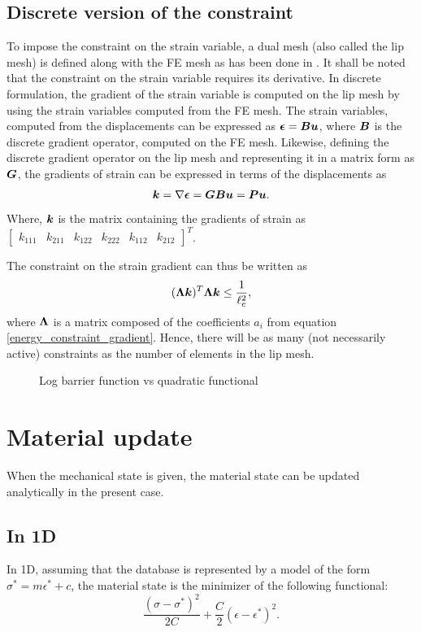\documentclass[10pt]{elsarticle}
\begin{document}
\subsection{Discrete version of the constraint}
To impose the constraint on the strain variable, a dual mesh (also called the lip mesh) is defined along with the FE mesh as has been done in \cite{Moes and Chevaugeon}. It shall be noted that the constraint on the strain variable requires its derivative. In discrete formulation, the gradient of the strain variable is computed on the lip mesh by using the strain variables computed from the FE mesh. The strain variables, computed from the displacements can be expressed as $\mbox{\boldmath $\epsilon$} = \mbox{\boldmath $B$} \mbox{\boldmath $u$}$, where $\mbox{\boldmath $B$}$ is the discrete gradient operator, computed on the FE mesh. Likewise, defining the discrete gradient operator on the lip mesh and representing it in a matrix form as $\mbox{\boldmath $G$}$, the gradients of strain can be expressed in terms of the displacements as 
\begin{equation}
	\mbox{\boldmath $k$} = \nabla \mbox{\boldmath $\epsilon$} = \mbox{\boldmath $G$} \mbox{\boldmath $B$} \mbox{\boldmath $u$} = \mbox{\boldmath $P$} \mbox{\boldmath $u$}.
\end{equation}
Where, $\mbox{\boldmath $k$}$ is the matrix containing the gradients of strain as $\begin{bmatrix}
	k_{111} & k_{211} & k_{122} & k_{222} & k_{112} & k_{212}
\end{bmatrix}^T$.

The constraint on the strain gradient can thus be written as 
\begin{equation} \label{discrete_constraint}
	(\mbox{\boldmath $\Lambda$} \mbox{\boldmath $k$} )^T \mbox{\boldmath $\Lambda$} \mbox{\boldmath $k$} \leq \frac{1}{\ell_c^2},
\end{equation}
where $\mbox{\boldmath $\Lambda$}$ is a matrix composed of the coefficients $a_i$ from equation \ref{energy_constraint_gradient}. Hence, there will be as many (not necessarily active) constraints as the number of elements in the lip mesh.

\begin{figure}[ht]
	\centering
	
	\caption{Log barrier function vs quadratic functional}
	\label{comparison_log_quadratic}
\end{figure}


\section{Material update\label{app_mat_update}}
When the mechanical state is given, the material state can be updated analytically in the present case. 
\subsection*{In 1D}
In 1D, assuming that the database is represented by a model of the form $\sigma^* = m \epsilon ^*+c$, the material state is the minimizer of the following functional:
\begin{equation}
	\frac{(\sigma - \sigma^*)^2}{2C} + \frac{C}{2}(\epsilon - \epsilon^*)^2.	 
\end{equation}
\end{document}
